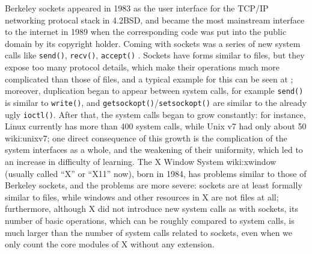 Berkeley sockets appeared in 1983 as the user interface
for the TCP/IP networking protocal stack in 4.2BSD, and became the most
mainstream interface to the internet in 1989 when the corresponding code was
put into the public domain by its copyright holder.  Coming with sockets was a
series of new system calls like \verb|send()|, \verb|recv()|, \verb|accept()|
\etal.  Sockets have forms similar to files, but they expose too many protocol
details, which make their operations much more complicated than those of files,
and a typical example for this can be seen at \parencite{pike2001}; moreover,
duplication began to appear between system calls, for example \verb|send()| is
similar to \verb|write()|, and \verb|getsockopt()|/\verb|setsockopt()| are
similar to the already ugly \verb|ioctl()|.  After that, the system calls began
to grow constantly: for instance, Linux currently has more than 400 system
calls, while Unix v7 had only about 50\cupercite%
{wiki:unixv7}; one direct consequence of this growth is the complication of
the system interfaces as a whole, and the weakening of their uniformity, which
led to an increase in difficulty of learning.  The X Window System\cupercite%
{wiki:xwindow} (usually called ``X'' or ``X11'' now), born in 1984, has
problems similar to those of Berkeley sockets, and the problems are more
severe: sockets are at least formally similar to files, while windows
and other resources in X are not files at all; furthermore, although
X did not introduce new system calls as with sockets, its number
of basic operations, which can be roughly compared to system calls,
is much larger than the number of system calls related to sockets,
even when we only count the core modules of X without any extension.

